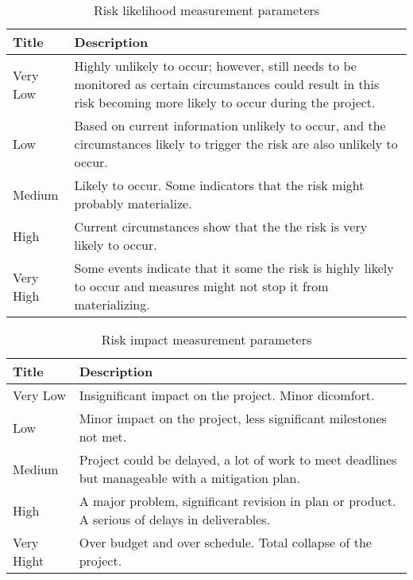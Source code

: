 \begin{center}
    \begin{table}
    \begin{tabular}{ | l | p{10cm} |}

    \hline
    Title & Description  \\ \hline
    Very Low & Highly unlikely to occur; however, still needs to be monitored as certain circumstances could result
    in this risk becoming more likely to occur during the project. \\ \hline
    Low & Based on current information unlikely to occur, and the circumstances likely to trigger the risk are also unlikely to occur. \\ \hline
    Medium & Likely to occur. Some indicators that the risk might probably materialize.  \\ \hline
    High & Current circumstances show that the the risk is very likely to occur. \\ \hline
    Very High & Some events indicate that it some the risk is highly likely to occur and measures might not stop it from materializing.\\ \hline
    \end{tabular}
    \caption{Risk likelihood measurement parameters}
    \label{tab:xyz}
    \end{table}
    
    \begin{table}
    \begin{tabular}{|l|p{10cm}|}
    \hline
    Title & Description \\ \hline
    Very Low & Insignificant impact on the project. Minor dicomfort. \\ \hline
    Low & Minor impact on the project, less significant milestones not met. \\ \hline
    Medium & Project could be delayed, a lot of work to meet deadlines but manageable with a mitigation plan. \\ \hline
    High & A major problem, significant revision in plan or product. A serious of delays in deliverables.\\ \hline
    Very Hight & Over budget and over schedule. Total collapse of the project. \\ \hline
    \end{tabular}
    \caption{Risk impact measurement parameters}
    \label{tab:xyz}
    \end{table}
        
\end{center}
